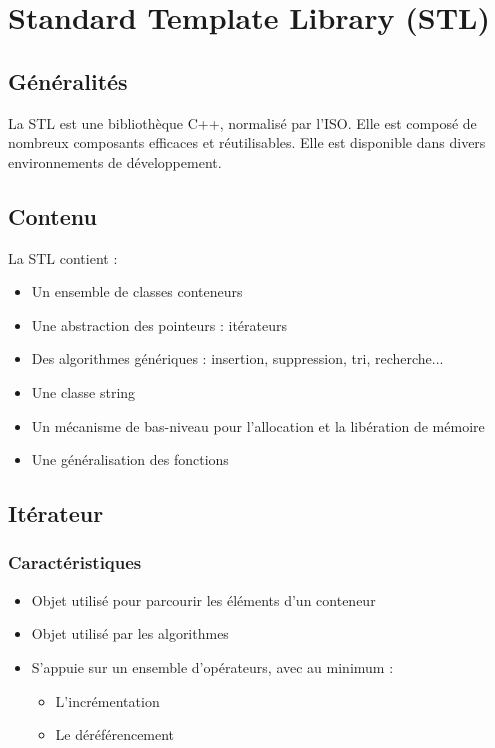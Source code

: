 \documentclass[10pt,a4paper,twoside]{article}
\begin{document}
\section{Standard Template Library (STL)}
\subsection{Généralités}
La STL est une bibliothèque C++, normalisé par l'ISO. Elle est composé de nombreux composants efficaces et réutilisables. Elle est disponible dans divers environnements de développement.

\subsection{Contenu}
La STL contient :
\begin{itemize}
\item Un ensemble de classes conteneurs
\item Une abstraction des pointeurs : itérateurs
\item Des algorithmes génériques : insertion, suppression, tri, recherche...
\item Une classe string
\item Un mécanisme de bas-niveau pour l'allocation et la libération de mémoire
\item Une généralisation des fonctions
\end{itemize}

\subsection{Itérateur}
\subsubsection{Caractéristiques}
\begin{itemize}
\item Objet utilisé pour parcourir les éléments d'un conteneur
\item Objet utilisé par les algorithmes
\item S'appuie sur un ensemble d'opérateurs, avec au minimum :
\begin{itemize}
\item L'incrémentation
\item Le déréférencement
\end{itemize}
\end{itemize}
\end{document}
